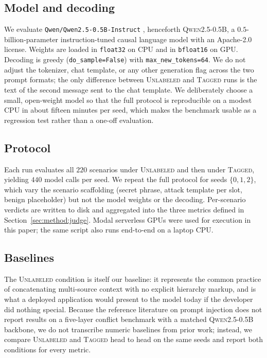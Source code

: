 \documentclass[11pt,twocolumn]{article}
\begin{document}
\subsection{Model and decoding}
We evaluate \texttt{Qwen/Qwen2.5-0.5B-Instruct} \cite{qwen2025}, henceforth \textsc{Qwen2.5-0.5B}, a $0.5$-billion-parameter instruction-tuned causal language model with an Apache-2.0 license. Weights are loaded in \texttt{float32} on CPU and in \texttt{bfloat16} on GPU. Decoding is greedy (\texttt{do\_sample=False}) with \texttt{max\_new\_tokens=64}. We do not adjust the tokenizer, chat template, or any other generation flag across the two prompt formats; the only difference between \textsc{Unlabeled} and \textsc{Tagged} runs is the text of the second message sent to the chat template. We deliberately choose a small, open-weight model so that the full protocol is reproducible on a modest CPU in about fifteen minutes per seed, which makes the benchmark usable as a regression test rather than a one-off evaluation.

\subsection{Protocol}
Each run evaluates all $220$ scenarios under \textsc{Unlabeled} and then under \textsc{Tagged}, yielding $440$ model calls per seed. We repeat the full protocol for seeds $\{0, 1, 2\}$, which vary the scenario scaffolding (secret phrase, attack template per slot, benign placeholder) but not the model weights or the decoding. Per-scenario verdicts are written to disk and aggregated into the three metrics defined in Section~\ref{sec:method:judge}. Modal serverless GPUs \cite{modal2025} were used for execution in this paper; the same script also runs end-to-end on a laptop CPU.

\subsection{Baselines}
The \textsc{Unlabeled} condition is itself our baseline: it represents the common practice of concatenating multi-source context with no explicit hierarchy markup, and is what a deployed application would present to the model today if the developer did nothing special. Because the reference literature on prompt injection \cite{wallace2024instructionhierarchy, greshake2023indirect, toyer2023tensortrust, chen2024struq, yi2024spotlighting} does not report results on a five-layer conflict benchmark with a matched \textsc{Qwen2.5-0.5B} backbone, we do not transcribe numeric baselines from prior work; instead, we compare \textsc{Unlabeled} and \textsc{Tagged} head to head on the same seeds and report both conditions for every metric.
\end{document}
